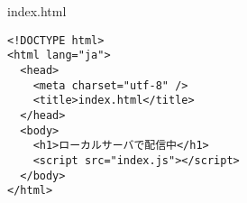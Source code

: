 \begin{listtitle}
index.html
\end{listtitle}
\begin{lstlisting}
<!DOCTYPE html>
<html lang="ja">
  <head>
    <meta charset="utf-8" />
    <title>index.html</title>
  </head>
  <body>
    <h1>ローカルサーバで配信中</h1>
    <script src="index.js"></script>
  </body>
</html>
\end{lstlisting}
\listend
